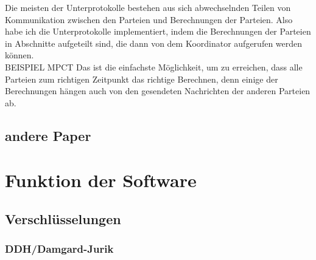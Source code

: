\documentclass[a4paper,10pt]{scrartcl}
\begin{document}
Die meisten der Unterprotokolle bestehen aus sich abwechselnden Teilen von Kommunikation zwischen den Parteien und Berechnungen der Parteien. Also habe ich die Unterprotokolle implementiert, indem die Berechnungen der Parteien in Abschnitte aufgeteilt sind, die dann von dem Koordinator aufgerufen werden können.\\
BEISPIEL MPCT
Das ist die einfachste Möglichkeit, um zu erreichen, dass alle Parteien zum richtigen Zeitpunkt das richtige Berechnen, denn einige der Berechnungen hängen auch von den gesendeten Nachrichten der anderen Parteien ab.\\


\subsection{andere Paper}


\section{Funktion der Software}
\subsection{Verschlüsselungen}
\subsubsection{DDH/Damgard-Jurik}
\end{document}
